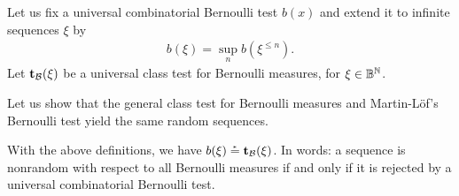\begin{definition}
  \label{def:g4.2.14}
Let us fix a universal combinatorial Bernoulli test \( b(x) \) and extend it to
infinite sequences \( \xi \) by
 \begin{align*}
   b(\xi) = \sup_{n} b(\xi^{\le n}).
 \end{align*}
Let \( \mathbf{t}_{\mathcal{B}}(\xi) \) be a universal class test for Bernoulli measures, for
\( \xi\in\mathbb{B}^{\mathbb{N}} \).
\end{definition}

Let us show that the general class test for Bernoulli measures and
Martin-L\"of's Bernoulli test yield the same random sequences.

 \begin{theorem}\label{thm:combinat-Bernoulli}
With the above definitions, we have \( b(\xi) \stackrel{{}_*}{=} \mathbf{t}_{\mathcal{B}}(\xi) \).
In words: a sequence is nonrandom with respect to all Bernoulli measures if and
only if it is rejected by a universal combinatorial Bernoulli test.
 \end{theorem}

